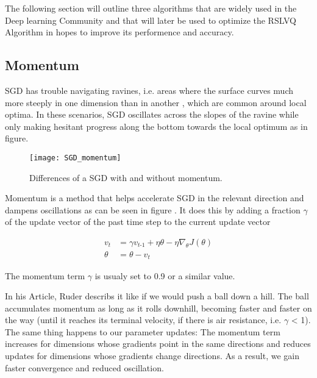 \documentclass[12pt,oneside,a4paper,parskip]{scrbook}
\begin{document}
The following section will outline three algorithms that are widely used in the Deep learning Community and that will later
be used to optimize the RSLVQ Algorithm in hopes to improve its performence and accuracy.

\subsection{Momentum}

SGD has trouble navigating ravines, i.e. areas where the surface curves much more steeply in one dimension than in another \cite{problemSteepLearn, overvieDiffRSLVQ},
which are common around local optima. In these scenarios, SGD oscillates across the slopes of the ravine while only making 
hesitant progress along the bottom towards the local optimum as in figure.

\begin{figure}[H]
  \centering
  \texttt{[image: SGD\_momentum]}
  \caption[Diff. SGD moment.]{Differences of a SGD with and without momentum.\footnotemark} 
  \label{fig:SGD_momentum}
\end{figure}

Momentum \cite{QIAN1999145, overvieDiffRSLVQ} is a method that helps accelerate SGD in the relevant direction and dampens
oscillations as can be seen in figure . It does this by adding a fraction $\gamma $ of the update vector of the past time step to the
current update vector

\begin{equation}
\begin{split}
\textit{v}_\textit{t} &= \gamma\textit{v}_\textit{t-1} + \eta \theta - \eta\nabla_\theta \textit{J}(\theta) \\
\theta &= \theta - \textit{v}_\textit{t}
\end{split}
\end{equation}

The momentum term $\gamma $ is usualy set to 0.9 or a similar value.

In his Article, Ruder \cite{overvieDiffRSLVQ} describs it like if we would push a ball down a hill. 
The ball accumulates momentum as long as it rolls downhill, becoming faster and faster on the way 
(until it reaches its terminal velocity, if there is air resistance, i.e. $\gamma $ < 1). 
The same thing happens to our parameter updates: The momentum term increases for dimensions whose gradients
point in the same directions and reduces updates for dimensions whose gradients change directions.
As a result, we gain faster convergence and reduced oscillation.
\end{document}
